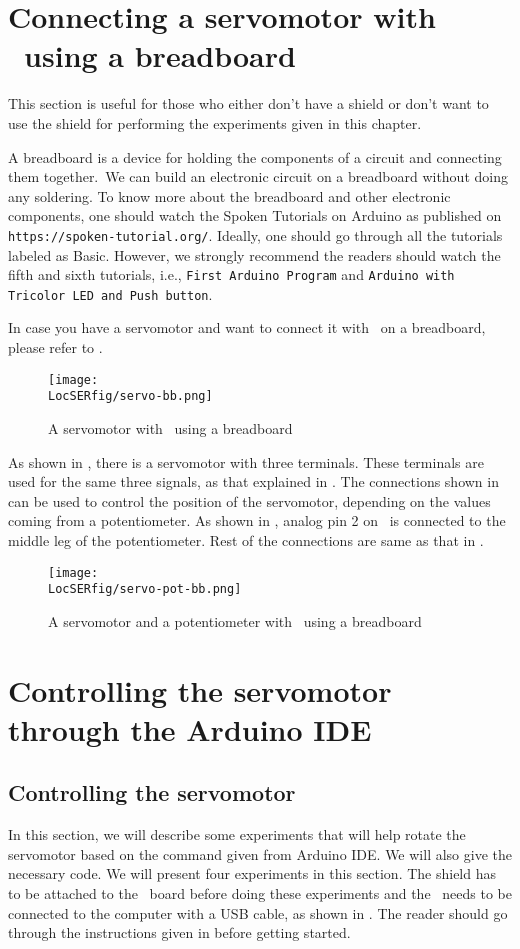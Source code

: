 \section{Connecting a servomotor with \arduino\ using a breadboard}
This section is useful for those who either don't have a shield or don't want to use the shield
for performing the experiments given in this chapter. 

A breadboard is a device for holding the components of a circuit and connecting 
them together. We can build an electronic circuit on a breadboard without doing any 
soldering. To know more about the breadboard and other electronic components, 
one should watch the Spoken Tutorials on Arduino as published on
  {\tt https://spoken-tutorial.org/}. Ideally, one should go through all the
tutorials labeled as Basic. However, we strongly recommend the readers should
watch the fifth and sixth tutorials, i.e., {\tt First Arduino Program} and 
  {\tt Arduino with Tricolor LED and Push button}.

In case you have a servomotor and want to connect it with \arduino\ on a breadboard, 
please refer to . 
\begin{figure}
  \centering
  \texttt{[image: \\LocSERfig/servo-bb.png]}
  \caption{A servomotor with \arduino\ using a breadboard}
  \label{fig:servo-bread}
\end{figure}
As shown in , there is a servomotor with three 
terminals. These terminals are used for the same three signals, as that explained 
in . The connections shown in  can 
be used to control the position of the servomotor, depending on the 
values coming from a potentiometer. As shown in , 
analog pin 2 on \arduino\ is connected to the middle leg of the 
potentiometer. Rest of the connections are same as that in . 

\begin{figure}
  \centering
  \texttt{[image: \\LocSERfig/servo-pot-bb.png]}
  \caption{A servomotor and a potentiometer with \arduino\ using a breadboard}
  \label{fig:servo-pot-bread}
\end{figure}

\section{Controlling the servomotor through the Arduino IDE}
\subsection{Controlling the servomotor}
\label{sec:servo-ard}
In this section, we will describe some experiments that will help
rotate the servomotor based on the command given from Arduino IDE.  We
will also give the necessary code.  We will present four experiments
in this section.  The shield has to be attached to the \arduino\ board
before doing these experiments and the \arduino\ needs to be connected to the computer 
with a USB cable, as shown in . The reader should go through the
instructions given in  before getting started.

